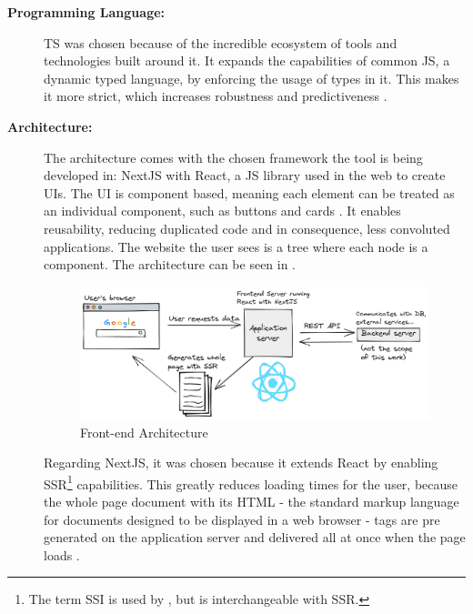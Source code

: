 \begin{description}
  \item[\textbf{Programming Language:}] \ac{TS} was chosen because of the incredible ecosystem of tools and technologies built around it. It expands the capabilities of common \ac{JS}, a dynamic typed language, by enforcing the usage of types in it. This makes it more strict, which increases robustness and predictiveness \cite{Bierman_2014}.
  \item[\textbf{Architecture:}] The architecture comes with the chosen framework the tool is being developed in: NextJS with React, a \ac{JS} library used in the web to create \aclp{UI}. The \ac{UI} is component based, meaning each element can be treated as an individual component, such as buttons and cards \cite{facebook_2022}. It enables reusability, reducing duplicated code and in consequence, less convoluted applications. The website the user sees is a tree where each node is a component. The architecture can be seen in .

    \begin{figure}[!htb]
      \caption{Front-end Architecture}\label{fig:arch}
      \begin{center}
        \includegraphics[width=14cm]{img/6-architecture.png}
      \end{center}
    \end{figure}

    Regarding NextJS, it was chosen because it extends React by enabling \ac{SSR}\footnote{The term \ac{SSI} is used by \textcite{DBLP:journals/corr/abs-0801-2618}, but is interchangeable with \acl{SSR}.} capabilities. This greatly reduces loading times for the user, because the whole page document with its \ac{HTML} - the standard markup language for documents designed to be displayed in a web browser \cite{patel2013incremental} - tags are pre generated on the application server and delivered all at once when the page loads \cite{DBLP:journals/corr/abs-0801-2618}.


\end{description}
